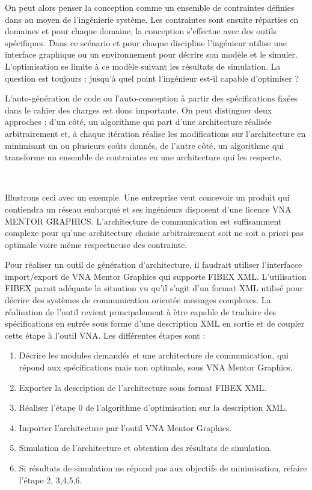\documentclass[11pt]{article}
\begin{document}
On peut alors penser la conception comme un ensemble de contraintes définies dans au moyen de l'ingénierie système. Les contraintes sont ensuite réparties en domaines et pour chaque domaine, la conception s'effectue avec des outils spécifiques. Dans ce scénario et pour chaque discipline l'ingénieur utilise une interface graphique ou un environnement pour décrire son modèle et le simuler. L'optimisation se limite à ce modèle suivant les résultats de simulation. La question est toujours : jusqu'à quel point l'ingénieur est-il capable d'optimiser ?

L’auto-génération de code ou l’auto-conception à partir des spécifications fixées dans le cahier des charges est donc importante. On peut distinguer deux approches : d'un côté, un algorithme qui part d’une architecture réalisée arbitrairement et, à chaque itération réalise les modifications sur l’architecture en minimisant un ou plusieurs coûts donnés, de l'autre côté, un algorithme qui transforme un ensemble de contraintes en une architecture qui les respecte.

~

Illustrons ceci avec un exemple. Une entreprise veut concevoir un produit qui contiendra un réseau embarqué et ses ingénieurs disposent d'une licence VNA MENTOR GRAPHICS. L'architecture de communication est suffisamment complexe pour qu'une architecture choisie arbitrairement soit ne soit a priori pas optimale voire même respectueuse des contrainte.

Pour réaliser un outil de génération d’architecture, il faudrait utiliser l’interfacce import/export de VNA Mentor Graphics qui supporte FIBEX XML. L’utilisation FIBEX parait adéquate la situation vu qu’il s’agit d’un format XML utilisé pour décrire des systèmes de communication orientée messages complexes. La réalisation de l’outil revient principalement à ètre capable de traduire des spécifications en entrée sous forme d’une description XML en sortie et de coupler cette étape à l’outil VNA. Les différentes étapes sont :
\begin{enumerate}
\item Décrire les modules demandés et une architecture de communication, qui répond aux spécifications mais non optimale, sous VNA Mentor Graphics.
\item Exporter la description de l’architecture sous format FIBEX XML.
\item Réaliser l’étape 0 de l’algorithme d’optimisation sur la description XML.
\item Importer l’architecture par l’outil VNA Mentor Graphics.
\item Simulation de l’architecture et obtention des résultats de simulation.
\item Si résultats de simulation ne répond pas aux objectifs de minimisation, refaire l’étape 2, 3,4,5,6.
\end{enumerate}
\end{document}
